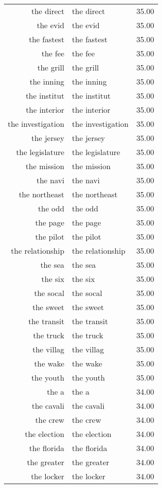 \begin{table}[ht]
\begin{tabular}{rlr}
  the direct & the direct & 35.00 \\ 
  the evid & the evid & 35.00 \\ 
  the fastest & the fastest & 35.00 \\ 
  the fee & the fee & 35.00 \\ 
  the grill & the grill & 35.00 \\ 
  the inning & the inning & 35.00 \\ 
  the institut & the institut & 35.00 \\ 
  the interior & the interior & 35.00 \\ 
  the investigation & the investigation & 35.00 \\ 
  the jersey & the jersey & 35.00 \\ 
  the legislature & the legislature & 35.00 \\ 
  the mission & the mission & 35.00 \\ 
  the navi & the navi & 35.00 \\ 
  the northeast & the northeast & 35.00 \\ 
  the odd & the odd & 35.00 \\ 
  the page & the page & 35.00 \\ 
  the pilot & the pilot & 35.00 \\ 
  the relationship & the relationship & 35.00 \\ 
  the sea & the sea & 35.00 \\ 
  the six & the six & 35.00 \\ 
  the socal & the socal & 35.00 \\ 
  the sweet & the sweet & 35.00 \\ 
  the transit & the transit & 35.00 \\ 
  the truck & the truck & 35.00 \\ 
  the villag & the villag & 35.00 \\ 
  the wake & the wake & 35.00 \\ 
  the youth & the youth & 35.00 \\ 
  the a & the a & 34.00 \\ 
  the cavali & the cavali & 34.00 \\ 
  the crew & the crew & 34.00 \\ 
  the election & the election & 34.00 \\ 
  the florida & the florida & 34.00 \\ 
  the greater & the greater & 34.00 \\ 
  the locker & the locker & 34.00 \\ 

\end{tabular}
\end{table}
